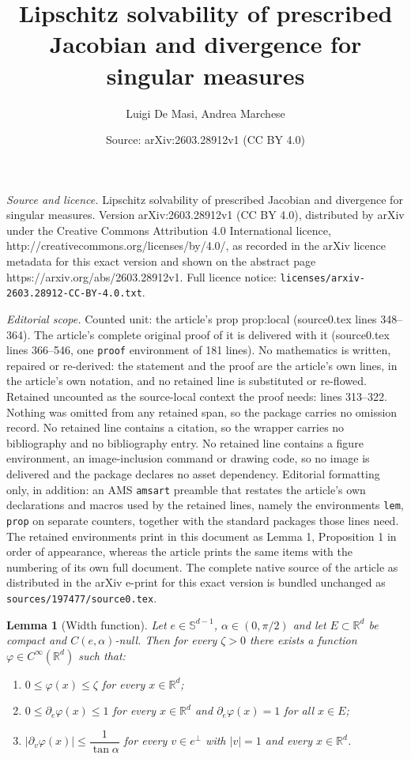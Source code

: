 \documentclass[10pt,a4paper]{amsart}
\title{Lipschitz solvability of prescribed Jacobian and divergence for singular measures}
\author{Luigi De Masi, Andrea Marchese}
\date{Source: arXiv:2603.28912v1 (CC BY 4.0)}
\newtheorem{lem}{Lemma}
\newcommand{\R}{\mathbb{R}}
\begin{document}
\maketitle

\noindent\emph{Source and licence.} Lipschitz solvability of prescribed Jacobian and divergence for singular measures. Version arXiv:2603.28912v1 (CC BY 4.0), distributed by arXiv under the Creative Commons Attribution 4.0 International licence, http://creativecommons.org/licenses/by/4.0/, as recorded in the arXiv licence metadata for this exact version and shown on the abstract page https://arxiv.org/abs/2603.28912v1. Full licence notice: \texttt{licenses/arxiv-2603.28912-CC-BY-4.0.txt}.\par\smallskip

\noindent\textit{Editorial scope.} Counted unit: the article's prop prop:local (source0.tex lines 348--364). The article's complete original proof of it is delivered with it (source0.tex lines 366--546, one \texttt{proof} environment of 181 lines). No mathematics is written, repaired or re-derived: the statement and the proof are the article's own lines, in the article's own notation, and no retained line is substituted or re-flowed.  Retained uncounted as the source-local context the proof needs: lines 313--322.  Nothing was omitted from any retained span, so the package carries no omission record.  No retained line contains a citation, so the wrapper carries no bibliography and no bibliography entry.  No retained line contains a figure environment, an image-inclusion command or drawing code, so no image is delivered and the package declares no asset dependency.  Editorial formatting only, in addition: an AMS \texttt{amsart} preamble that restates the article's own declarations and macros used by the retained lines, namely the environments \texttt{lem}, \texttt{prop} on separate counters, together with the standard packages those lines need.  The retained environments print in this document as Lemma 1, Proposition 1 in order of appearance, whereas the article prints the same items with the numbering of its own full document.  The complete native source of the article as distributed in the arXiv e-print for this exact version is bundled unchanged as \texttt{sources/197477/source0.tex}.
\begin{lem}[Width function]\label{lem:width}
Let $e\in \mathbb{S}^{d-1}$, $\alpha\in(0,\pi/2)$ and let $E\subset\R^d$ be compact and $C(e,\alpha)$-null.
Then for every $\zeta>0$ there exists a function $\varphi\in C^\infty(\R^d)$ such that:
\begin{enumerate}[label=\rm(\roman*),leftmargin=2em]
\item $0\le \varphi(x)\le \zeta$ for every $x \in \R^d$;
\item $0\le \partial_e\varphi(x)\le 1$ for every $x \in \R^d$ and $\partial_e\varphi(x)=1$ for all $x \in E$;
\item $|\partial_v\varphi(x)| \le \dfrac{1}{\tan\alpha}$ for every $v \in e^\perp$ with $|v|=1$ and every $x \in \R^d$.
\end{enumerate}
\end{lem}
\end{document}
